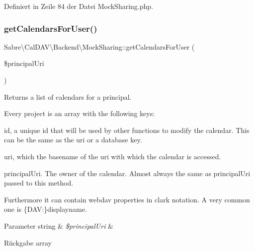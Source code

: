 Definiert in Zeile 84 der Datei Mock\+Sharing.\+php.

\mbox{\label{class_sabre_1_1_cal_d_a_v_1_1_backend_1_1_mock_sharing_a7cc6409f0296b256ee8132d5179afc21}} 
\subsubsection{\texorpdfstring{get\+Calendars\+For\+User()}{getCalendarsForUser()}}
{\footnotesize\ttfamily Sabre\textbackslash{}\+Cal\+D\+A\+V\textbackslash{}\+Backend\textbackslash{}\+Mock\+Sharing\+::get\+Calendars\+For\+User (\begin{DoxyParamCaption}\item[{}]{\$principal\+Uri }\end{DoxyParamCaption})}

Returns a list of calendars for a principal.

Every project is an array with the following keys\+:
\begin{DoxyItemize}
\item id, a unique id that will be used by other functions to modify the calendar. This can be the same as the uri or a database key.
\item uri, which the basename of the uri with which the calendar is accessed.
\item principal\+Uri. The owner of the calendar. Almost always the same as principal\+Uri passed to this method.
\end{DoxyItemize}

Furthermore it can contain webdav properties in clark notation. A very common one is \textquotesingle{}\{D\+AV\+:\}displayname\textquotesingle{}.


\begin{DoxyParams}[1]{Parameter}
string & {\em \$principal\+Uri} & \\
\hline
\end{DoxyParams}
\begin{DoxyReturn}{Rückgabe}
array 
\end{DoxyReturn}


